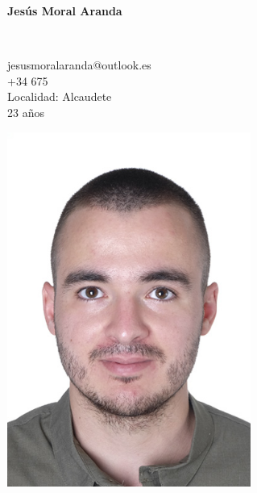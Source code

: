\documentclass{report}
\begin{document}
\noindent
\begin{minipage}{0.7\textwidth} 
\vspace{-1cm}
    \Large{\textbf{Jesús Moral Aranda}}\\
    \large{
    \textbf{}\\
    \vspace{.1cm}
    }
\hspace{5pt} jesusmoralaranda@outlook.es\\
+34 675 \\
Localidad: Alcaudete \\ 23 años
\end{minipage}
\begin{minipage}{0.3\textwidth} %
\hspace{3cm}
    \includegraphics[width=0.6\textwidth]{FOTO CARNET.jpg}
\end{minipage}
\end{document}
